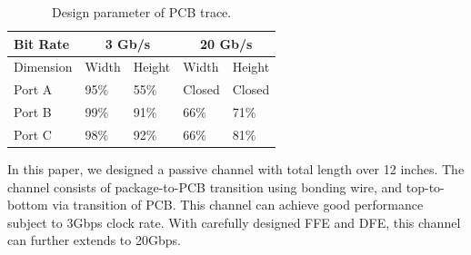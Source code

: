 \documentclass{book}  %
\renewcommand{\section}[1]{\psection{#1}}
\begin{document}
\begin{paper}
\begin{table}[htbp!]
	\renewcommand{\arraystretch}{1.3}	
	\begin{center}
		\begin{tabular}{| l | l | l | l | l |}
			\hline
			Bit Rate  &\multicolumn{2}{c|}{3 Gb/s} & \multicolumn{2}{c|}{20 Gb/s}   \\ 
			\hline
			Dimension  & Width  & Height  & Width  & Height \\
			\hline
			Port A  & 95\%  & 55\%  & Closed  & Closed \\
			\hline
			Port B  & 99\%  & 91\%  & 66\%  & 71\% \\
			\hline
			Port C  & 98\%  & 92\%  & 66\%  & 81\% \\
			\hline
		\end{tabular}
	\end{center}
	\label{table:pcb_via_tran}
	\caption{Design parameter of PCB trace.}
\end{table}


\section{Conclusion}
In this paper, we designed a passive channel with total length over 12 inches. The channel consists of package-to-PCB transition using bonding wire, and top-to-bottom via transition of PCB. This channel can achieve good performance subject to 3Gbps clock rate. With carefully designed FFE and DFE, this channel can further extends to 20Gbps. 





%

\end{paper}
\end{document}
